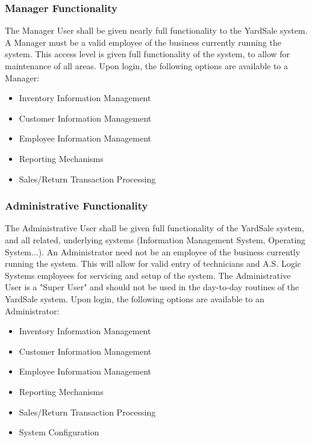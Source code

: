 \documentclass{report}
\begin{document}
            \subsubsection{Manager Functionality}
                The Manager User shall be given nearly full
                functionality to the YardSale system.  A Manager must be a
                valid employee of the business currently running the
                system.  This access level is given full functionality
                of the system, to allow for maintenance of all
                areas.  Upon login, the following options are
                available to a Manager:

                \begin{itemize}
                    \item Inventory Information Management
                    \item Customer Information Management
                    \item Employee Information Management
                    \item Reporting Mechanisms
                    \item Sales/Return Transaction Processing
                \end{itemize}

            \subsubsection{Administrative Functionality}
                The Administrative User shall be given full
                functionality of the YardSale system, and all
                related, underlying systems (Information Management
                System, Operating System...).  An Administrator
                need not be an employee of the business currently
                running the system.  This will allow for valid
                entry of technicians and A.S. Logic
                Systems employees for servicing and setup of the
                system.  The Administrative User is a "Super User"
                and should not be used in the day-to-day routines
                of the YardSale system.  Upon login, the following
                options are available to an Administrator:

                \begin{itemize}
                    \item Inventory Information Management
                    \item Customer Information Management
                    \item Employee Information Management
                    \item Reporting Mechanisms
                    \item Sales/Return Transaction Processing
                    \item System Configuration
                \end{itemize}
\end{document}
